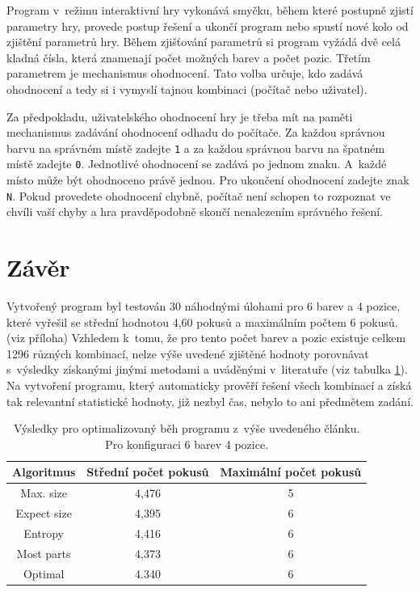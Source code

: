 \documentclass[12pt, a4paper]{article}
\begin{document}
Program v~režimu interaktivní hry vykonává smyčku, během které postupně zjistí parametry hry, provede postup řešení a ukončí program nebo spustí nové kolo od zjištění parametrů hry. Během zjišťování parametrů si program vyžádá dvě celá kladná čísla, která znamenají počet možných barev a počet pozic. Třetím parametrem je mechanismus ohodnocení. Tato volba určuje, kdo zadává ohodnocení a tedy si i vymyslí tajnou kombinaci (počítač nebo uživatel). 

Za předpokladu, uživatelského ohodnocení hry je třeba mít na paměti mechanismus zadávání ohodnocení odhadu do počítače. Za každou správnou barvu na správném místě zadejte \texttt{1} a za každou správnou barvu na špatném místě zadejte \texttt{0}. Jednotlivé ohodnocení se zadává po jednom znaku. A~každé místo může být ohodnoceno právě jednou. Pro ukončení ohodnocení zadejte znak \texttt{N}. Pokud provedete ohodnocení chybně, počítač není schopen to rozpoznat ve chvíli vaší chyby a hra pravděpodobně skončí nenalezením správného řešení.  

\newpage
\section{Závěr}  %


Vytvořený program byl testován 30 náhodnými úlohami pro 6 barev a 4 pozice, které vyřešil se střední hodnotou 4,60 pokusů a maximálním počtem   6 pokusů. (viz příloha) Vzhledem k~tomu, že pro tento počet barev a pozic existuje celkem 1296 různých kombinací, nelze výše uvedené zjištěné hodnoty porovnávat s~výsledky získanými jinými metodami a uváděnými v~literatuře (viz tabulka \ref{tab:data}). Na vytvoření programu, který automaticky prověří řešení všech kombinací a získá tak relevantní statistické hodnoty, již nezbyl čas, nebylo to ani předmětem zadání.

\begin{table}[ht]
\begin{tabular}{c | c | c}

Algoritmus & Střední počet pokusů  & Maximální počet pokusů\\
\hline
Max. size  	&   4,476 &  5\\
Expect size	 &4,395   & 6\\
Entropy      &  4,416  & 6\\
Most parts   &   4,373 &  6\\
Optimal      &   4.340 &  6\\

\end{tabular}
\label{tab:data}
\caption{Výsledky pro optimalizovaný běh programu z~výše uvedeného článku. Pro konfiguraci 6 barev 4 pozice.}
\end{table}
		
\end{document}
